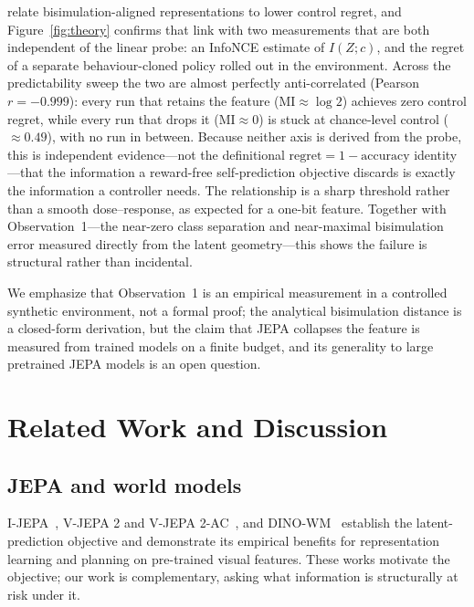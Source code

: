 \documentclass[11pt]{article}
\begin{document}
\citet{zhang2020dbc} relate bisimulation-aligned representations to lower control regret, and
Figure~\ref{fig:theory} confirms that link with two measurements that are both independent of the
linear probe: an InfoNCE estimate of $I(Z;c)$, and the regret of a separate behaviour-cloned policy
rolled out in the environment. Across the predictability sweep the two are almost perfectly
anti-correlated (Pearson $r=-0.999$): every run that retains the feature
($\mathrm{MI}\approx\log 2$) achieves zero control regret, while every run that drops it
($\mathrm{MI}\approx 0$) is stuck at chance-level control ($\approx 0.49$), with no run in between.
Because neither axis is derived from the probe, this is independent evidence---not the definitional
$\text{regret}=1-\text{accuracy}$ identity---that the information a reward-free self-prediction
objective discards is exactly the information a controller needs. The relationship is a sharp
threshold rather than a smooth dose--response, as expected for a one-bit feature. Together with
Observation~1---the near-zero class separation and near-maximal bisimulation error measured directly
from the latent geometry---this shows the failure is structural rather than incidental.

We emphasize that Observation~1 is an empirical measurement in a controlled synthetic environment,
not a formal proof; the analytical bisimulation distance is a closed-form derivation, but the claim
that JEPA collapses the feature is measured from trained models on a finite budget, and its
generality to large pretrained JEPA models is an open question.

\section{Related Work and Discussion}

\subsection{JEPA and world models}
I-JEPA~\citep{assran2023ijepa}, V-JEPA 2 and V-JEPA 2-AC~\citep{vjepa2_2025}, and
DINO-WM~\citep{zhou2024dinowm} establish the latent-prediction objective and demonstrate its
empirical benefits for representation learning and planning on pre-trained visual features. These
works motivate the objective; our work is complementary, asking what information is structurally at
risk under it.
\end{document}
